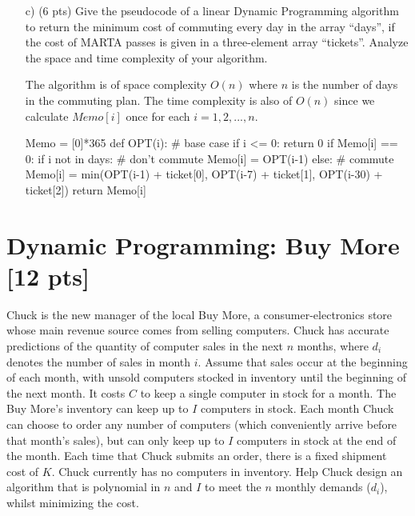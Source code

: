 \documentclass{article}
\let\oldnl\nl%
\newcommand\nonl{%
  \renewcommand{\nl}{\let\nl\oldnl}}%
\begin{document}
\begin{itemize}
\begin{tcolorbox}
\end{tcolorbox}

\item[c)] (6 pts) Give the pseudocode of  a   linear   Dynamic   Programming   algorithm   to   return   the   minimum   cost   of commuting  every day in the array “days”, if the cost of MARTA passes is given in a three-element array “tickets”.	Analyze the space and time complexity of your algorithm.\\
\begin{tcolorbox}
The algorithm is of space complexity $O(n)$ where $n$ is the number of days in the commuting plan. The time complexity is also of $O(n)$ since we calculate $Memo[i]$ once for each $i = 1, 2, ..., n$.
\begin{python}
Memo = [0]*365            
def OPT(i):
    # base case
    if i <= 0:
        return 0
    if Memo[i] == 0:
        if i not in days:
        # don't commute
            Memo[i] = OPT(i-1)
        else:
        # commute
            Memo[i] = min(OPT(i-1) + ticket[0], OPT(i-7) + ticket[1], OPT(i-30) + ticket[2])
    return Memo[i]
\end{python}
\end{tcolorbox}

\end{itemize}


\section{Dynamic Programming: Buy More [12 pts]}
Chuck is the new manager of the local Buy More, a consumer-electronics store whose main revenue source comes from selling computers. Chuck has accurate predictions of the quantity of computer sales in the next $n$ months, where $d_{i}$ denotes the number of sales in month $i$. Assume that sales occur at the beginning of each month, with unsold computers stocked in inventory until the beginning of the next month. It costs $C$ to keep a single computer in stock for a month. The Buy More's inventory can keep up to $I$ computers in stock. Each month Chuck can choose to order any number of computers (which conveniently arrive before that month's sales), but can only keep up to $I$ computers in stock at the end of the month. Each time that Chuck submits an order, there is a fixed shipment cost of $K$.  Chuck currently has no computers in inventory. Help Chuck design an algorithm that is polynomial in $n$ and $I$ to meet the $n$ monthly demands ($d_{i}$), whilst minimizing the cost. 
\end{document}
